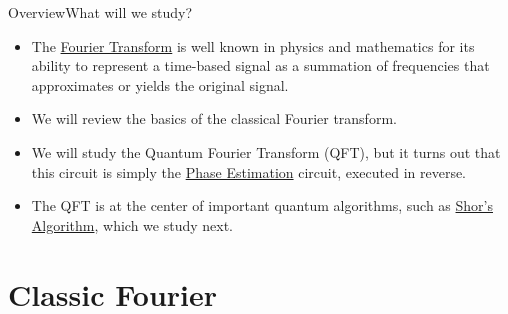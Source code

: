 
\begin{frame}{Overview}{What will we study?}

\begin{itemize}
    \item The \href{https://en.wikipedia.org/wiki/Fourier_transform}{Fourier Transform} is well known in physics and mathematics for its ability to represent a time-based signal as a summation of frequencies that approximates or yields the original signal.
    \item We will review the basics of the classical Fourier transform.
    \item We will study the Quantum Fourier Transform (QFT), but it turns out that this circuit is simply the \href{https://en.wikipedia.org/wiki/Quantum_phase_estimation_algorithm}{Phase Estimation} circuit, executed in reverse.
    \item The QFT is at the center of important quantum algorithms, such as \href{https://en.wikipedia.org/wiki/Shor\%27s_algorithm}{Shor's Algorithm}, which we study next.
\end{itemize}
\end{frame}

\section*{Classic Fourier}

